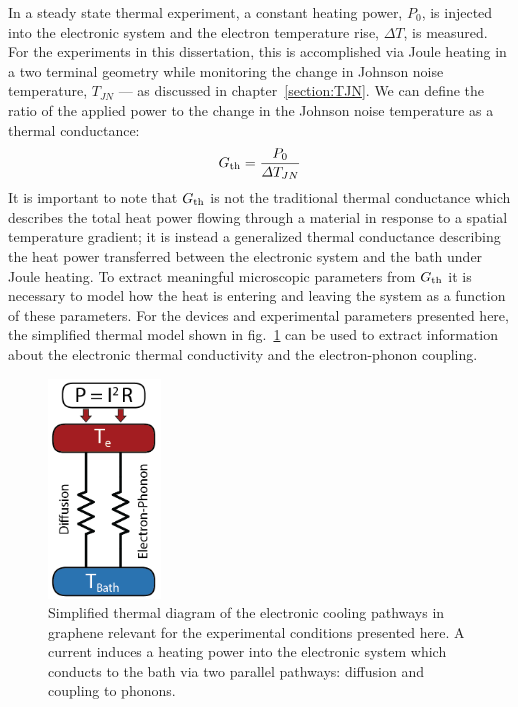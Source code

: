 In a steady state thermal experiment, a constant heating power, $P_0$, is injected into the electronic system and the electron temperature rise, $\Delta T$, is measured. For the experiments in this dissertation, this is accomplished via Joule heating in a two terminal geometry while monitoring the change in Johnson noise temperature, $T_{JN}$ --- as discussed in chapter~\ref{section:TJN}. We can define the ratio of the applied power to the change in the Johnson noise temperature as a thermal conductance:
\begin{equation}
G_{\mathrm{th}} = \frac{P_0}{\Delta T_{JN}}
\end{equation}
It is important to note that $G_{\mathrm{th}}$ is not the traditional thermal conductance which describes the total heat power flowing through a material in response to a spatial temperature gradient; it is instead a generalized thermal conductance describing the heat power transferred between the electronic system and the bath under Joule heating. To extract meaningful microscopic parameters from $G_{\mathrm{th}}$ it is necessary to model how the heat is entering and leaving the system as a function of these parameters. For the devices and experimental parameters presented here, the simplified thermal model shown in fig.~\ref{fig:thermal_diagram2} can be used to extract information about the electronic thermal conductivity and the electron-phonon coupling.
\begin{figure}
\centering
\includegraphics[width = 30mm]{figures/thermal_via_noise/thermal_diagram.png}
\caption{Simplified thermal diagram of the electronic cooling pathways in graphene relevant for the experimental conditions presented here. A current induces a heating power into the electronic system which conducts to the bath via two parallel pathways: diffusion and coupling to phonons.}
\label{fig:thermal_diagram2}
\end{figure}

